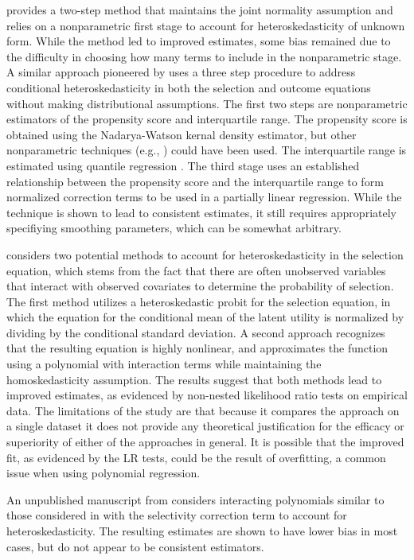 \documentclass{article}
\begin{document}
\citet{donald1995} provides a two-step method that maintains the joint normality assumption and relies on a nonparametric first stage to account for heteroskedasticity of unknown form. While the method led to improved estimates, some bias remained due to the difficulty in choosing how many terms to include in the nonparametric stage. A similar approach pioneered by \citet{chen2003} uses a three step procedure to address conditional heteroskedasticity in both the selection and outcome equations without making distributional assumptions.  The first two steps are nonparametric estimators of the propensity score and interquartile range.  The propensity score is obtained using the Nadarya-Watson kernal density estimator, but other nonparametric techniques (e.g., \citet{klein1993}) could have been used.  The interquartile range is estimated using quantile regression \citep{koenker1978}.  The third stage uses an established relationship between the propensity score and the interquartile range to form normalized correction terms to be used in a partially linear regression.  While the technique is shown to lead to consistent estimates, it still requires appropriately specifiying smoothing parameters, which can be somewhat arbitrary.

\citet{schaffner2002} considers two potential methods to account for heteroskedasticity in the selection equation, which stems from the fact that there are often unobserved variables that interact with observed covariates to determine the probability of selection.  The first method utilizes a heteroskedastic probit for the selection equation, in which the equation for the conditional mean of the latent utility is normalized by dividing by the conditional standard deviation. A second approach recognizes that the resulting equation is highly nonlinear, and approximates the function using a polynomial with interaction terms while maintaining the homoskedasticity assumption.  The results suggest that both methods lead to improved estimates, as evidenced by non-nested likelihood ratio tests \citep{vuong1989} on empirical data.  The limitations of the study are that because it compares the approach on a single dataset it does not provide any theoretical justification for the efficacy or superiority of either of the approaches in general.  It is possible that the improved fit, as evidenced by the LR tests, could be the result of overfitting, a common issue when using polynomial regression.   

An unpublished manuscript from \citet{adkins2004} considers interacting polynomials similar to those considered in \citet{schaffner2002} with the selectivity correction term to account for heteroskedasticity.  The resulting estimates are shown to have lower bias in most cases, but do not appear to be consistent estimators.
\end{document}
